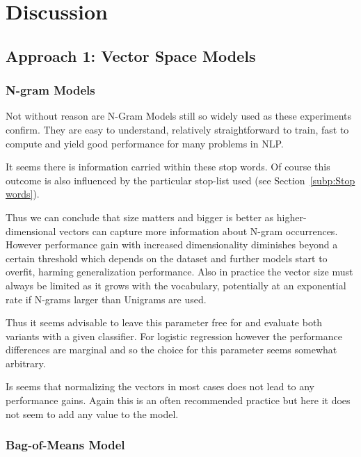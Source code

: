 
\clearpage

\section{Discussion}
\label{sec:Discussion}


\subsection{Approach 1: Vector Space Models}
\label{sub:Approach 1: Vector Space Models (Results)}

\subsubsection{N-gram Models}

Not without reason are N-Gram Models still so widely used as these experiments confirm. They are easy to understand, relatively straightforward to train, fast to compute and yield good performance for many problems in \gls{NLP}.

It seems there is information carried within these stop words. Of course this outcome is also influenced by the particular stop-list used (see Section~\ref{subp:Stop words}).

Thus we can conclude that size matters and bigger is better as higher-dimensional vectors can capture more information about N-gram occurrences. However performance gain with increased dimensionality diminishes beyond a certain threshold which depends on the dataset and further models start to overfit, harming generalization performance.
Also in practice the vector size must always be limited as it grows with the vocabulary, potentially at an exponential rate if N-grams larger than Unigrams are used.

 Thus it seems advisable to leave this parameter free for and evaluate both variants with a given classifier. For logistic regression however the performance differences are marginal and so the choice for this parameter seems somewhat arbitrary.


 Is seems that normalizing the vectors in most cases does not lead to any performance gains. Again this is an often recommended practice but here it does not seem to add any value to the model.


\subsubsection{Bag-of-Means Model}

